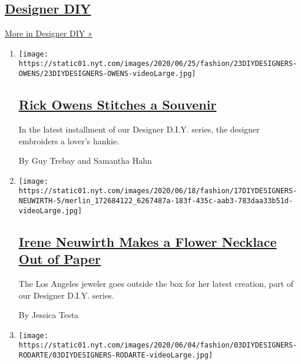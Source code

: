\hypertarget{designer-diy}{%
\subsection{\texorpdfstring{\href{/issue/fashion/2020/06/19/designer-diy}{Designer
DIY}}{Designer DIY}}\label{designer-diy}}

\href{/issue/fashion/2020/06/19/designer-diy}{More in Designer DIY »}

\begin{enumerate}
\def\labelenumi{\arabic{enumi}.}
\item
  \texttt{[image: https://static01.nyt.com/images/2020/06/25/fashion/23DIYDESIGNERS-OWENS/23DIYDESIGNERS-OWENS-videoLarge.jpg]}

  \hypertarget{rick-owens-stitches-a-souvenir}{%
  \subsection{\texorpdfstring{\href{/2020/06/23/style/DIY-sewing-rick-owens-stitches-a-souvenir.html}{Rick
  Owens Stitches a
  Souvenir}}{Rick Owens Stitches a Souvenir}}\label{rick-owens-stitches-a-souvenir}}

  In the latest installment of our Designer D.I.Y. series, the designer
  embroiders a lover's hankie.

  By Guy Trebay and Samantha Hahn
\item
  \texttt{[image: https://static01.nyt.com/images/2020/06/18/fashion/17DIYDESIGNERS-NEUWIRTH-5/merlin\_172684122\_6267487a-183f-435c-aab3-783daa33b51d-videoLarge.jpg]}

  \hypertarget{irene-neuwirth-makes-a-flower-necklace-out-of-paper}{%
  \subsection{\texorpdfstring{\href{/2020/06/17/style/paper-flower-necklace-DIY.html}{Irene
  Neuwirth Makes a Flower Necklace Out of
  Paper}}{Irene Neuwirth Makes a Flower Necklace Out of Paper}}\label{irene-neuwirth-makes-a-flower-necklace-out-of-paper}}

  The Los Angeles jeweler goes outside the box for her latest creation,
  part of our Designer D.I.Y. series.

  By Jessica Testa
\item
  \texttt{[image: https://static01.nyt.com/images/2020/06/04/fashion/03DIYDESIGNERS-RODARTE/03DIYDESIGNERS-RODARTE-videoLarge.jpg]}

  \hypertarget{how-to-make-a-dish-towel-tote-bag-with-rodarte}{%
}
\end{enumerate}
